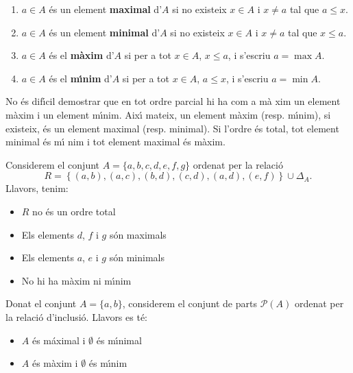 \begin{enumerate}
\item $a\in A$ \'{e}s un element \textbf{maximal} d'$A$ si no existeix $x\in
A$ i $x\neq a$ tal que $a\leq x$.

\item $a\in A$ \'{e}s un element \textbf{minimal} d'$A$ si no existeix $x\in
A$ i $x\neq a$ tal que $x\leq a$.

\item $a\in A$ \'{e}s el \textbf{m\`{a}xim} d'$A$ si per a tot $x\in A$, $%
x\leq a$, i s'escriu $a=\max A$.

\item $a\in A$ \'{e}s el \textbf{m\'{\i}nim} d'$A$ si per a tot $x\in A$, $%
a\leq x$, i s'escriu $a=\min A$.
\end{enumerate}

No \'{e}s dif\'{\i}cil demostrar que en tot ordre parcial hi ha com a m\`{a}%
xim un element m\`{a}xim i un element m\'{\i}nim. Aix\'{\i} mateix, un
element m\`{a}xim (resp. m\'{\i}nim), si existeix, \'{e}s un element maximal
(resp. minimal). Si l'ordre \'{e}s total, tot element minimal \'{e}s m\'{\i}%
nim i tot element maximal \'{e}s m\`{a}xim.

\begin{exem}
Considerem el conjunt $A=\{a,b,c,d,e,f,g\}$ ordenat per la relaci\'{o}%
\begin{equation*}
R=\left\{ (a,b),(a,c),(b,d),(c,d),(a,d),(e,f)\right\} \cup\Delta_{A}\text{.}
\end{equation*}
Llavors, tenim:

\begin{itemize}
\item $R$ no \'{e}s un ordre total

\item Els elements $d$, $f$ i $g$ s\'{o}n maximals

\item Els elements $a$, $e$ i $g$ s\'{o}n minimals

\item No hi ha m\`{a}xim ni m\'{\i}nim
\end{itemize}
\end{exem}

\begin{exem}
Donat el conjunt $A=\{a,b\}$, considerem el conjunt de parts $\mathcal{P}(A)$
ordenat per la relaci\'{o} d'inclusi\'{o}. Llavors es t\'{e}:

\begin{itemize}
\item $A$ \'{e}s m\'{a}ximal i $\emptyset$ \'{e}s m\'{\i}nimal

\item $A$ \'{e}s m\`{a}xim i $\emptyset$ \'{e}s m\'{\i}nim
\end{itemize}
\end{exem}

